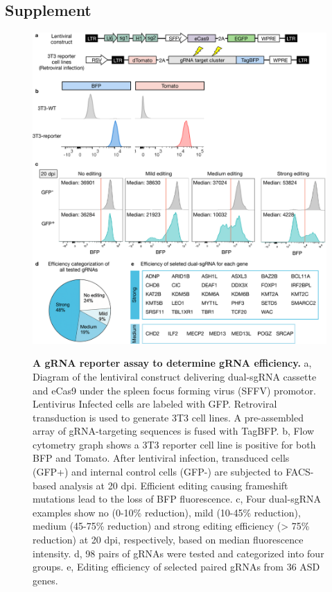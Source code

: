\clearpage

\subsection{Supplement}
\beginsupplement

\begin{figure}[h!]
    \centering
	\includegraphics[width=\textwidth]{figures/asd/Figure_S1}
    \label{fig:asdS1}
    \caption{\textbf{A gRNA reporter assay to determine gRNA efficiency.} a, Diagram of the lentiviral construct delivering dual-sgRNA cassette and eCas9 under the spleen focus forming virus (SFFV) promotor. Lentivirus Infected cells are labeled with GFP. Retroviral transduction is used to generate 3T3 cell lines. A pre-assembled array of gRNA-targeting sequences is fused with TagBFP. b, Flow cytometry graph shows a 3T3 reporter cell line is positive for both BFP and Tomato. After lentiviral infection, transduced cells (GFP+) and internal control cells (GFP-) are subjected to FACS-based analysis at 20 dpi. Efficient editing causing frameshift mutations lead to the loss of BFP fluorescence. c, Four dual-sgRNA examples show no (0-10\% reduction), mild (10-45\% reduction), medium (45-75\% reduction) and strong editing efficiency (> 75\% reduction) at 20 dpi, respectively, based on median fluorescence intensity. d, 98 pairs of gRNAs were tested and categorized into four groups. e, Editing efficiency of selected paired gRNAs from 36 ASD genes.}
\end{figure}



